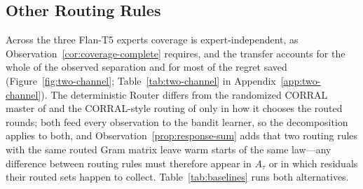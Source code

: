 \documentclass[anon]{alt2027} %
\begin{document}
\subsection{Other Routing Rules}
\label{app:routers}

Across the three Flan-T5 experts coverage is
expert-independent, as Observation~\ref{cor:coverage-complete} requires, and the
transfer accounts for the whole of the observed separation and for most of the
regret saved (Figure~\ref{fig:two-channel}; Table~\ref{tab:two-channel} in
Appendix~\ref{app:two-channel}). The deterministic Router differs from the
randomized CORRAL master of \citet{agarwal2017corralling} and the CORRAL-style
routing of \citet{chen2024llmdecision} only in how it chooses the routed
rounds; both feed every observation to the bandit learner, so the
decomposition applies to both, and Observation~\ref{prop:response-sum} adds
that two routing rules with the same routed Gram matrix leave warm starts of the
same law---any difference between routing rules must therefore appear in $A_\tau$ or
in which residuals their routed sets happen to collect.
Table~\ref{tab:baselines} runs both alternatives.
\end{document}

